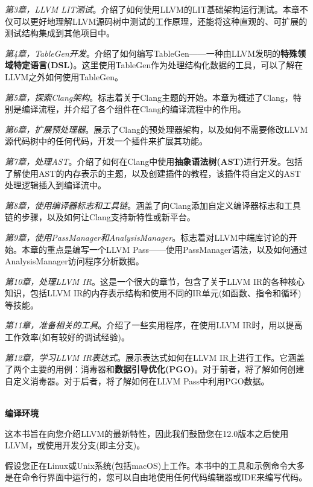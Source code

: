 \textit{第3章，LLVM LIT测试}。介绍了如何使用LLVM的LIT基础架构运行测试。本章不仅可以更好地理解LLVM源码树中测试的工作原理，还能将这种直观的、可扩展的测试结构集成到其他项目中。

\textit{第4章，TableGen开发}。介绍了如何编写TableGen——一种由LLVM发明的\textbf{特殊领域特定语言(DSL)}。这里使用TableGen作为处理结构化数据的工具，可以了解在LLVM之外如何使用TableGen。

\textit{第5章，探索Clang架构}。标志着关于Clang主题的开始。本章为概述了Clang，特别是编译流程，并介绍了各个组件在Clang的编译流程中的作用。

\textit{第6章，扩展预处理器}。展示了Clang的预处理器架构，以及如何不需要修改LLVM源代码树中的任何代码，开发一个插件来扩展其功能。

\textit{第7章，处理AST}。介绍了如何在Clang中使用\textbf{抽象语法树(AST)}进行开发。包括了解使用AST的内存表示的主题，以及创建插件的教程，该插件将自定义的AST处理逻辑插入到编译流中。

\textit{第8章，使用编译器标志和工具链}。涵盖了向Clang添加自定义编译器标志和工具链的步骤，以及如何让Clang支持新特性或新平台。

\textit{第9章，使用PassManager和AnalysisManager}。标志着对LLVM中端库讨论的开始。本章的重点是编写一个LLVM Pass——使用PassManager语法，以及如何通过AnalysisManager访问程序分析数据。

\textit{第10章，处理LLVM IR}。这是一个很大的章节，包含了关于LLVM IR的各种核心知识，包括LLVM IR的内存表示结构和使用不同的IR单元(如函数、指令和循环)等技能。

\textit{第11章，准备相关的工具}。介绍了一些实用程序，在使用LLVM IR时，用以提高工作效率(如有较好的调试经验)。

\textit{第12章，学习LLVM IR表达式}。展示表达式如何在LLVM IR上进行工作。它涵盖了两个主要的用例：消毒器和\textbf{数据引导优化(PGO)}。对于前者，将了解如何创建自定义消毒器。对于后者，将了解如何在LLVM Pass中利用PGO数据。

\hspace*{\fill} \\ %
\textbf{编译环境}

这本书旨在向您介绍LLVM的最新特性，因此我们鼓励您在12.0版本之后使用LLVM，或使用开发分支(即主分支)。

假设您正在Linux或Unix系统(包括macOS)上工作。本书中的工具和示例命令大多是在命令行界面中运行的，您可以自由地使用任何代码编辑器或IDE来编写代码。

